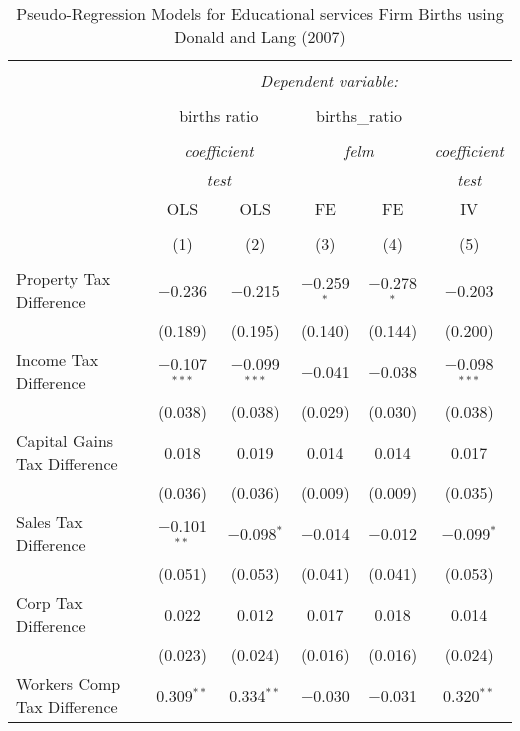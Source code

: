
\begin{table}[!htbp] \centering 
  \caption{Pseudo-Regression Models for  Educational services Firm Births using Donald and Lang (2007)} 
  \label{} 
\begin{tabular}{@{\extracolsep{5pt}}lccccc} 
\\[-1.8ex]\hline 
\hline \\[-1.8ex] 
 & \multicolumn{5}{c}{\textit{Dependent variable:}} \\ 
\cline{2-6} 
\\[-1.8ex] & \multicolumn{2}{c}{births ratio} & \multicolumn{2}{c}{births\_ratio} &   \\ 
\\[-1.8ex] & \multicolumn{2}{c}{\textit{coefficient}} & \multicolumn{2}{c}{\textit{felm}} & \textit{coefficient} \\ 
 & \multicolumn{2}{c}{\textit{test}} & \multicolumn{2}{c}{\textit{}} & \textit{test} \\ 
 & OLS & OLS & FE & FE & IV \\ 
\\[-1.8ex] & (1) & (2) & (3) & (4) & (5)\\ 
\hline \\[-1.8ex] 
 Property Tax Difference & $-$0.236 & $-$0.215 & $-$0.259$^{*}$ & $-$0.278$^{*}$ & $-$0.203 \\ 
  & (0.189) & (0.195) & (0.140) & (0.144) & (0.200) \\ 
  Income Tax Difference & $-$0.107$^{***}$ & $-$0.099$^{***}$ & $-$0.041 & $-$0.038 & $-$0.098$^{***}$ \\ 
  & (0.038) & (0.038) & (0.029) & (0.030) & (0.038) \\ 
  Capital Gains Tax Difference & 0.018 & 0.019 & 0.014 & 0.014 & 0.017 \\ 
  & (0.036) & (0.036) & (0.009) & (0.009) & (0.035) \\ 
  Sales Tax Difference & $-$0.101$^{**}$ & $-$0.098$^{*}$ & $-$0.014 & $-$0.012 & $-$0.099$^{*}$ \\ 
  & (0.051) & (0.053) & (0.041) & (0.041) & (0.053) \\ 
  Corp Tax Difference & 0.022 & 0.012 & 0.017 & 0.018 & 0.014 \\ 
  & (0.023) & (0.024) & (0.016) & (0.016) & (0.024) \\ 
  Workers Comp Tax Difference & 0.309$^{**}$ & 0.334$^{**}$ & $-$0.030 & $-$0.031 & 0.320$^{**}$ \\ 

\end{tabular}
\end{table}
